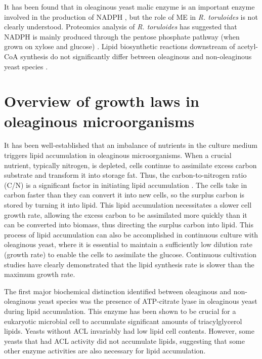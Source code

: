 It has been found that in oleaginous yeast malic enzyme is an important enzyme involved in the production of NADPH \cite{Ratledge2002}, but the role of ME in \textit{R. toruloides} is not clearly understood. Proteomics analysis of \textit{R. toruloides} has suggested that NADPH is mainly produced through the pentose phosphate pathway (when grown on xylose and glucose) \cite{Zhu2012}. Lipid biosynthetic reactions downstream of acetyl-CoA synthesis do not significantly differ between oleaginous and non-oleaginous yeast species \cite{Fakas2016}. %

\section{Overview of growth laws in oleaginous microorganisms}

It has been well-established that an imbalance of nutrients in the culture medium triggers lipid accumulation in oleaginous microorganisms. When a crucial nutrient, typically nitrogen, is depleted, cells continue to assimilate excess carbon substrate and transform it into storage fat. \cite{Ratledge2002} Thus, the carbon-to-nitrogen ratio (C/N) is a significant factor in initiating lipid accumulation \cite{Lopes2020}.
The cells take in carbon faster than they can convert it into new cells, so the surplus carbon is stored by turning it into lipid. This lipid accumulation necessitates a slower cell growth rate, allowing the excess carbon to be assimilated more quickly than it can be converted into biomass, thus directing the surplus carbon into lipid. This process of lipid accumulation can also be accomplished in continuous culture with oleaginous yeast, where it is essential to maintain a sufficiently 
low dilution rate (growth rate) to enable the cells to assimilate the glucose. Continuous cultivation studies have clearly demonstrated that the lipid synthesis rate is slower than the maximum growth rate. \cite{Ratledge2002}

The first major biochemical distinction identified between oleaginous and non-oleaginous yeast species was the presence of ATP-citrate lyase in oleaginous yeast during lipid accumulation. This enzyme has been shown to be crucial for a eukaryotic microbial cell to accumulate significant amounts of triacylglycerol lipids. Yeasts without ACL 
invariably had low lipid cell contents. However, some yeasts that had ACL activity did not accumulate lipids, suggesting that some other enzyme activities are also necessary for lipid accumulation. \cite{Ratledge2002}

